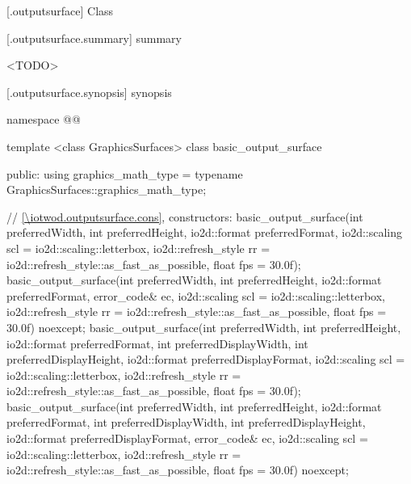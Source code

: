  [\iotwod.outputsurface] {Class }

 [\iotwod.outputsurface.summary] { summary}

\pnum
{}%
<TODO>

 [\iotwod.outputsurface.synopsis] { synopsis}

\begin{codeblock}
namespace @\fullnamespace{}@ {
  template <class GraphicsSurfaces>
  class basic_output_surface {
  public:
    using graphics_math_type = typename GraphicsSurfaces::graphics_math_type;

    // \ref{\iotwod.outputsurface.cons}, constructors:
    basic_output_surface(int preferredWidth, int preferredHeight,
      io2d::format preferredFormat,
      io2d::scaling scl = io2d::scaling::letterbox,
      io2d::refresh_style rr = io2d::refresh_style::as_fast_as_possible,
      float fps = 30.0f);
    basic_output_surface(int preferredWidth, int preferredHeight,
      io2d::format preferredFormat,
      error_code& ec, io2d::scaling scl = io2d::scaling::letterbox,
      io2d::refresh_style rr = io2d::refresh_style::as_fast_as_possible,
      float fps = 30.0f) noexcept;
    basic_output_surface(int preferredWidth, int preferredHeight,
      io2d::format preferredFormat, int preferredDisplayWidth,
      int preferredDisplayHeight, io2d::format preferredDisplayFormat,
      io2d::scaling scl = io2d::scaling::letterbox,
      io2d::refresh_style rr = io2d::refresh_style::as_fast_as_possible,
      float fps = 30.0f);
    basic_output_surface(int preferredWidth, int preferredHeight,
      io2d::format preferredFormat, int preferredDisplayWidth,
      int preferredDisplayHeight, io2d::format preferredDisplayFormat,
      error_code& ec, io2d::scaling scl = io2d::scaling::letterbox,
      io2d::refresh_style rr = io2d::refresh_style::as_fast_as_possible,
      float fps = 30.0f) noexcept;

}}
\end{codeblock}
